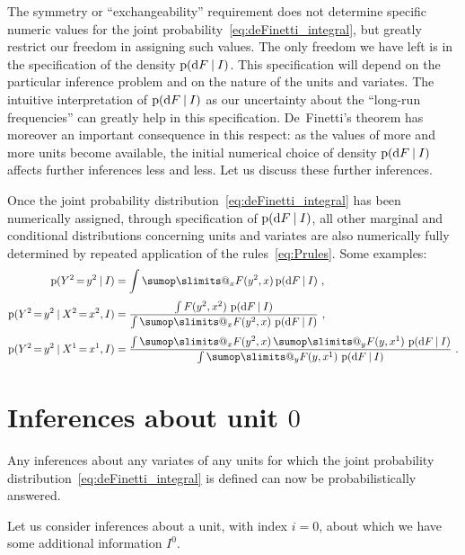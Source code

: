\documentclass[\ifafour a4paper,12pt,\else a5paper,10pt,\fi%
onecolumn,oneside,article,%
british%
]{memoir}
\makeatletter
\theoremstyle{remark}
\theoremstyle{innote}
\def\sum{\DOTSI\sumop\slimits@}
\newcommand*{\di}{\mathrm{d}}%
\newcommand*{\p}{\mathrm{p}}%
\renewcommand*{\|}[1][]{\nonscript\:#1\vert\nonscript\:\mathopen{}}
\newcommand*{\mo}[1][=]{\mathord{\,#1\,}}
\makeatother
\begin{document}
The symmetry or \enquote{exchangeability} requirement does not determine specific numeric values for the joint probability~\eqref{eq:deFinetti_integral}, but greatly restrict our freedom in assigning such values. The only freedom we have left is in the specification of the density $\p(\di F \|I)$. This specification will depend on the particular inference problem and on the nature of the units and variates. The intuitive interpretation of $\p(\di F \|I)$ as our uncertainty about the \enquote{long-run frequencies} can greatly help in this specification. De~Finetti's theorem has moreover an important consequence in this respect: as the values of more and more units become available, the initial numerical choice of density $\p(\di F \|I)$ affects further inferences less and less. Let us discuss these further inferences.

Once the joint probability distribution~\eqref{eq:deFinetti_integral} has been numerically assigned, through specification of $\p(\di F \|I)$, all other marginal and conditional distributions concerning units and variates are also numerically fully determined by repeated application of the rules~\eqref{eq:Prules}. Some examples:
\begin{subequations}
    \label{eq:further_infs}
  \begin{align}
    \p(Y^{2}\mo y^{2} \|I) &=
    \int
    \sum_{x}F(y^{2},x)\,\p(\di F \|I) \ ,
    \\[\jot]
    \p(Y^{2}\mo y^{2} \| X^{2}\mo x^{2}, I) &=
    \frac{\int F(y^{2},x^{2})\ \p(\di F \|I)}{
      \int \sum_{x}F(y^{2},x)\ \p(\di F \|I)
    } \ ,
    \\[\jot]
    \p(Y^{2}\mo y^{2} \| X^{1}\mo x^{1}, I) &=
    \frac{\int \sum_{x}F(y^{2},x)\, \sum_{y}F(y,x^{1})\  \p(\di F \|I)}{
      \int \sum_{y}F(y,x^{1})\  \p(\di F \|I)
    } \ .
  \end{align}
\end{subequations}


\section{Inferences about unit $0$}
\label{sec:unit0}

Any inferences about any variates of any units for which the joint probability distribution~\eqref{eq:deFinetti_integral} is defined can now be probabilistically answered.

Let us consider inferences about a unit, with index $i=0$, about which we have some additional information $I^{0}$.
\end{document}
